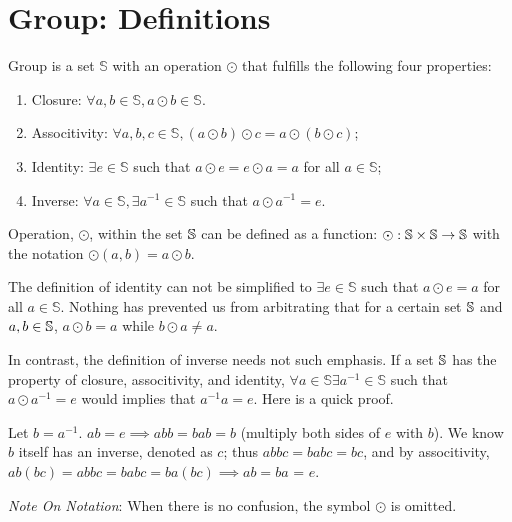 \documentclass[../note.tex]{subfiles}
\begin{document}
\section{Group: Definitions}

\begin{definition}[Group]
Group is a set $\mathbb{S}$ with an operation $\odot$ that fulfills the following four properties:
\begin{enumerate}
	\item Closure: $\forall a,b\in \mathbb{S}, a\odot b\in \mathbb{S}$.
	\item Associtivity: $\forall a, b, c \in \mathbb{S}, (a \odot b) \odot c = a \odot (b \odot c)$;
	\item Identity: $\exists e\in \mathbb{S}$ such that $a\odot e = e\odot a = a$ for all $a\in \mathbb{S}$;
	\item Inverse: $\forall a\in \mathbb{S}, \exists a^{-1}\in \mathbb{S}$ such that $a\odot a^{-1} = e$.
\end{enumerate}

\begin{remark}
	Operation, $\odot $, within the set $\mathbb{S}$ can be defined as a function: $\odot: \mathbb{S}\times \mathbb{S} \rightarrow \mathbb{S}$ with the notation $\odot (a,b)=a \odot b$.

	The definition of identity can not be simplified to $\exists e\in \mathbb{S}$ such that $a\odot e = a$ for all $a\in \mathbb{S}$. 
	Nothing has prevented us from arbitrating that for a certain set $\mathbb{S}$ and $a, b \in \mathbb{S}$, $a \odot b = a$ while $b \odot a\neq a$.

	In contrast, the definition of inverse needs not such emphasis. If a set $\mathbb{S}$ has the property of closure, associtivity, and identity, $\forall a\in \mathbb{S} \exists a^{-1}\in \mathbb{S}$ such that $a\odot a^{-1} = e$ would implies that $a^{-1}a = e$. Here is a quick proof.

	Let $b = a^{-1}$.
	$a b=e \implies a b b = b a b = b$ (multiply both sides of $e$ with $b$). We know $b$ itself has an inverse, denoted as $c$; thus $a b b c = b a b c = b c$, and by associtivity, $a b (b c) = a b b c = b a b c = ba(bc) \implies a b = b a$ = $e$.  
\end{remark}

\emph{Note On Notation}: When there is no confusion, the symbol $\odot$ is omitted. \label{notation:Omission_Of_Group_Operator}

\end{definition}
\end{document}
